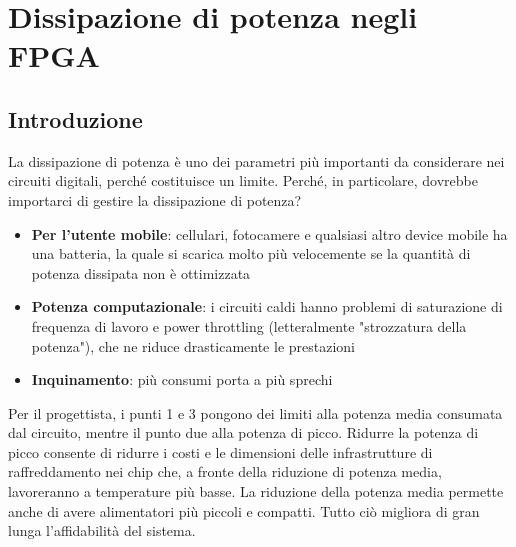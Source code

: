 \documentclass{book}
\begin{document}
\chapter{Dissipazione di potenza negli FPGA}
    \section{Introduzione}
        La dissipazione di potenza è uno dei parametri più importanti da considerare nei circuiti 
        digitali, perché costituisce un limite. Perché, in particolare, dovrebbe importarci di gestire 
        la dissipazione di potenza?
        \begin{itemize}
            \item \textbf{Per l'utente mobile}: cellulari, fotocamere e qualsiasi altro device mobile ha una batteria,
            la quale si scarica molto più velocemente se la quantità di potenza dissipata non è ottimizzata
            \item \textbf{Potenza computazionale}: i circuiti caldi hanno problemi di saturazione di frequenza di lavoro e power throttling 
            (letteralmente "strozzatura della potenza"), che ne riduce drasticamente le prestazioni 
            \item \textbf{Inquinamento}: più consumi porta a più sprechi 
        \end{itemize}
    Per il progettista, i punti 1 e 3 pongono dei limiti alla potenza media consumata dal circuito, mentre 
    il punto due alla potenza di picco. Ridurre la potenza di picco consente di ridurre i costi e le dimensioni
    delle infrastrutture di raffreddamento nei chip che, a fronte della riduzione di potenza media, lavoreranno a temperature
    più basse. La riduzione della potenza media permette anche di avere alimentatori più piccoli e compatti. Tutto ciò 
    migliora di gran lunga l'affidabilità del sistema. 
    \\ \\
\end{document}
